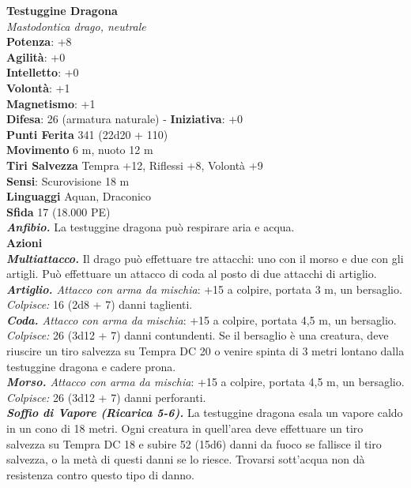 \begin{multicols}{2}
\medskip\textbf{Testuggine Dragona}\\
\emph{Mastodontica drago, neutrale}\\
\textbf{Potenza}: +8\\
\textbf{Agilità}: +0\\
\textbf{Intelletto}: +0\\
\textbf{Volontà}: +1\\
\textbf{Magnetismo}: +1\\
\textbf{Difesa}: 26 (armatura naturale) - \textbf{Iniziativa}: +0\\
\textbf{Punti Ferita} 341 (22d20 + 110)\\
\textbf{Movimento} 6 m, nuoto 12 m\\
\textbf{Tiri Salvezza} Tempra +12, Riflessi +8, Volontà +9\\
\textbf{Sensi}: Scurovisione 18 m\\
\textbf{Linguaggi} Aquan, Draconico\\
\textbf{Sfida} 17 (18.000 PE)\smallskip\\
\emph{\textbf{Anfibio.}} La testuggine dragona può respirare aria e acqua.\\
\smallskip\textbf{Azioni}\\
\emph{\textbf{Multiattacco.}} Il drago può effettuare tre attacchi: uno con il morso e due con gli artigli. Può effettuare un attacco di coda al posto di due attacchi di artiglio.\\
\emph{\textbf{Artiglio.} Attacco con arma da mischia}: +15 a colpire, portata 3 m, un bersaglio.\\
\emph{Colpisce:} 16 (2d8 + 7) danni taglienti. \\
\emph{\textbf{Coda.} Attacco con arma da mischia}: +15 a colpire, portata 4,5 m, un bersaglio.\\
\emph{Colpisce:} 26 (3d12 + 7) danni contundenti. Se il bersaglio è una creatura, deve riuscire un tiro salvezza su Tempra DC 20 o venire spinta di 3 metri lontano dalla testuggine dragona e cadere prona. \\
\emph{\textbf{Morso.} Attacco con arma da mischia}: +15 a colpire, portata 4,5 m, un bersaglio.\\
\emph{Colpisce:} 26 (3d12 + 7) danni perforanti. \\
\emph{\textbf{Soffio di Vapore (Ricarica 5-6).}} La testuggine dragona esala un vapore caldo in un cono di 18 metri. Ogni creatura in quell'area deve effettuare un tiro salvezza su Tempra DC 18 e subire 52 (15d6) danni da fuoco se fallisce il tiro salvezza, o la metà di questi danni se lo riesce. Trovarsi sott'acqua non dà resistenza contro questo tipo di danno.\\

\end{multicols}
